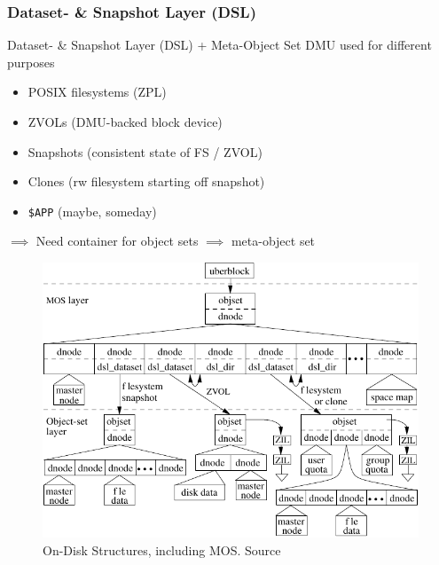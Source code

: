 \subsubsection{Dataset- \& Snapshot Layer (DSL)}
\begin{frame}[allowframebreaks]{Dataset- \& Snapshot Layer (DSL) + Meta-Object Set}
	DMU used for different purposes \vspace{10pt}
	\begin{itemize}
		\item POSIX filesystems (ZPL) %
		\item ZVOLs (DMU-backed block device)
		\item Snapshots (consistent state of FS / ZVOL)
		\item Clones (rw filesystem starting off snapshot)
		\item \texttt{\$APP} (maybe, someday)
	\end{itemize}  \vspace{10pt}
	$\implies$ Need container for object sets $\implies$ \alert{meta-object set}
	\pagebreak
	\begin{figure}
	\centering
	\includegraphics[height=0.75\textheight]{assets/on_disk/detailed_with_dsl_structures}
	\caption{On-Disk Structures, including MOS. Source \cite{introimplzfs}}
	\end{figure}
\end{frame}

